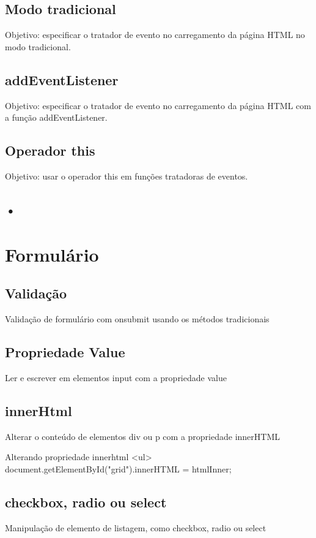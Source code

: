 \subsection{Modo tradicional}
Objetivo: especificar o tratador de evento no carregamento da página HTML no modo tradicional.
\subsection{addEventListener}
 Objetivo: especificar o tratador de evento no carregamento da página HTML com a função addEventListener.
 
\subsection{Operador this}
 Objetivo: usar o operador this em funções tratadoras de eventos.
\subsection{•}


\section{Formulário}
\subsection{Validação}
Validação de formulário com onsubmit usando os métodos tradicionais


\subsection{Propriedade Value}
Ler e escrever em elementos input com a propriedade value



\subsection{innerHtml}
Alterar o conteúdo de elementos div ou p com a propriedade innerHTML

Alterando propriedade innerhtml <ul> document.getElementById("grid").innerHTML = htmlInner; 

\subsection{checkbox, radio ou select}
Manipulação de elemento de listagem, como checkbox, radio ou select



